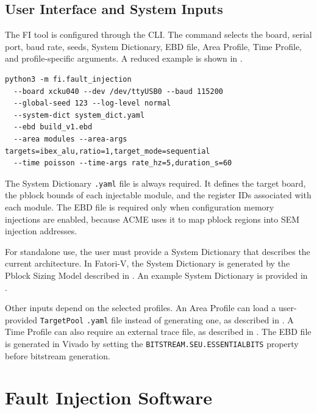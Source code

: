 \subsection{User Interface and System Inputs}
\label{chap8:fi_user_interface}

The \ac{FI} tool is configured through the \ac{CLI}. The command selects the board, serial port, baud rate, seeds, System Dictionary, \ac{EBD} file, Area Profile, Time Profile, and profile-specific arguments. A reduced example is shown in .

\begin{lstlisting}[float=h,caption={Reduced example of the FI CLI usage.},label={lst:fi_cli_example}]
python3 -m fi.fault_injection
  --board xcku040 --dev /dev/ttyUSB0 --baud 115200
  --global-seed 123 --log-level normal
  --system-dict system_dict.yaml
  --ebd build_v1.ebd 
  --area modules --area-args targets=ibex_alu,ratio=1,target_mode=sequential 
  --time poisson --time-args rate_hz=5,duration_s=60

\end{lstlisting}

The System Dictionary \texttt{.yaml} file is always required. It defines the target board, the pblock bounds of each injectable module, and the register IDs associated with each module. The \ac{EBD} file is required only when configuration memory injections are enabled, because \ac{ACME} uses it to map pblock regions into \ac{SEM} injection addresses.

For standalone use, the user must provide a System Dictionary that describes the current architecture. In \ac{Fatori-V}, the System Dictionary is generated by the Pblock Sizing Model described in . An example System Dictionary is provided in .

Other inputs depend on the selected profiles. An Area Profile can load a user-provided \texttt{TargetPool} \texttt{.yaml} file instead of generating one, as described in . A Time Profile can also require an external trace file, as described in . The \ac{EBD} file is generated in Vivado by setting the \texttt{BITSTREAM.SEU.ESSENTIALBITS} property before bitstream generation.






\section{Fault Injection Software}
\label{chap8:fi_software}

